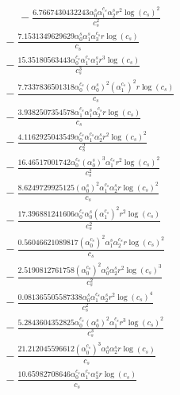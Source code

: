 \documentclass[10pt]{article}
\begin{document}
\begin{align*}
\phantom{R_{2,8}} &\phantom{={}}{}  - \frac{6.7667430432243 \alpha_{0}^s \alpha_{1}^{c_s} \alpha_{2}^s r^{2} \log{\left(c_{s} \right)}^{2}}{c_{s}^{2}} \\
&{}  - \frac{7.1531349629629 \alpha_{0}^s \alpha_{1}^s \alpha_{3}^{c_s} r \log{\left(c_{s} \right)}}{c_{s}} \\
&{}  - \frac{15.35180563443 \alpha_{0}^{c_s} \alpha_{1}^{c_s} \alpha_{1}^s r^{3} \log{\left(c_{s} \right)}}{c_{s}^{3}} \\
&{}  - \frac{7.7337836501318 \alpha_{0}^{c_s} \left(\alpha_{0}^s\right)^{2} \left(\alpha_{1}^{c_s}\right)^{2} r \log{\left(c_{s} \right)}}{c_{s}} \\
&{}  - \frac{3.9382507354578 \alpha_{1}^{c_s} \alpha_{1}^s \alpha_{2}^{c_s} r \log{\left(c_{s} \right)}}{c_{s}} \\
&{}  - \frac{4.1162925043549 \alpha_{0}^{c_s} \alpha_{1}^{c_s} \alpha_{2}^s r^{2} \log{\left(c_{s} \right)}^{2}}{c_{s}^{2}} \\
&{}  - \frac{16.46517001742 \alpha_{0}^{c_s} \left(\alpha_{0}^s\right)^{3} \alpha_{1}^{c_s} r^{2} \log{\left(c_{s} \right)}^{2}}{c_{s}^{2}} \\
&{}  - \frac{8.6249729925125 \left(\alpha_{0}^s\right)^{2} \alpha_{1}^{c_s} \alpha_{2}^s r \log{\left(c_{s} \right)}^{2}}{c_{s}} \\
&{}  - \frac{17.396881241606 \alpha_{0}^{c_s} \alpha_{0}^s \left(\alpha_{1}^{c_s}\right)^{2} r^{2} \log{\left(c_{s} \right)}}{c_{s}^{2}} \\
&{}  - \frac{0.56046621089817 \left(\alpha_{0}^{c_s}\right)^{2} \alpha_{1}^s \alpha_{2}^{c_s} r \log{\left(c_{s} \right)}^{2}}{c_{s}} \\
&{}  - \frac{2.5190812761758 \left(\alpha_{0}^{c_s}\right)^{2} \alpha_{0}^s \alpha_{2}^s r^{2} \log{\left(c_{s} \right)}^{3}}{c_{s}^{2}} \\
&{}  - \frac{0.081365505587338 \alpha_{0}^s \alpha_{1}^{c_s} \alpha_{2}^s r^{2} \log{\left(c_{s} \right)}^{4}}{c_{s}^{2}} \\
&{}  - \frac{5.2843604352825 \alpha_{0}^{c_s} \left(\alpha_{0}^s\right)^{2} \alpha_{1}^{c_s} r^{3} \log{\left(c_{s} \right)}^{2}}{c_{s}^{3}} \\
&{}  - \frac{21.212045596612 \left(\alpha_{0}^{c_s}\right)^{3} \alpha_{0}^s \alpha_{2}^s r \log{\left(c_{s} \right)}}{c_{s}} \\
&{}  - \frac{10.65982708646 \alpha_{0}^{c_s} \alpha_{1}^{c_s} \alpha_{3}^s r \log{\left(c_{s} \right)}}{c_{s}} \\

\end{align*}
\end{document}
